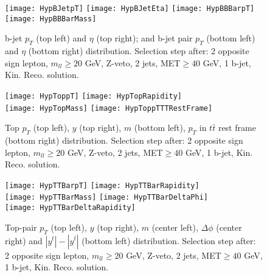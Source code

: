 \begin{figure}
  \texttt{[image: HypBJetpT]}
  \texttt{[image: HypBJetEta]}
  \texttt{[image: HypBBBarpT]}
  \texttt{[image: HypBBBarMass]}
\caption{b-jet $p_T$ (top left) and $\eta$ (top right); and b-jet pair $p_T$ (bottom left) and $\eta$ (bottom right) distribution. Selection step after: 2 opposite sign lepton, $m_{ll}\geq20$ GeV, Z-veto, 2 jets, MET$\geq40$ GeV, 1 b-jet, Kin. Reco. solution.}
\end{figure}

\clearpage
\newpage



\begin{figure}
  \texttt{[image: HypToppT]}
  \texttt{[image: HypTopRapidity]}\\
  \texttt{[image: HypTopMass]}
  \texttt{[image: HypToppTTTRestFrame]}
\caption{Top $p_T$ (top left), $y$ (top right), $m$ (bottom left), $p_T$ in $t\bar{t}$ rest frame (bottom right) distribution. Selection step after: 2 opposite sign lepton, $m_{ll}\geq20$ GeV, Z-veto, 2 jets, MET$\geq40$ GeV, 1 b-jet, Kin. Reco. solution.}
\end{figure}




\begin{figure}
  \texttt{[image: HypTTBarpT]}
  \texttt{[image: HypTTBarRapidity]}\\
  \texttt{[image: HypTTBarMass]}
  \texttt{[image: HypTTBarDeltaPhi]}\\
  \texttt{[image: HypTTBarDeltaRapidity]}
\caption{Top-pair $p_T$ (top left), $y$ (top right), $m$ (center left), $\Delta\phi$ (center right) and $|y^t|-|y^{\bar{t}}|$ (bottom left) distribution. Selection step after: 2 opposite sign lepton, $m_{ll}\geq20$ GeV, Z-veto, 2 jets, MET$\geq40$ GeV, 1 b-jet, Kin. Reco. solution.}
\end{figure}

\clearpage

\newpage